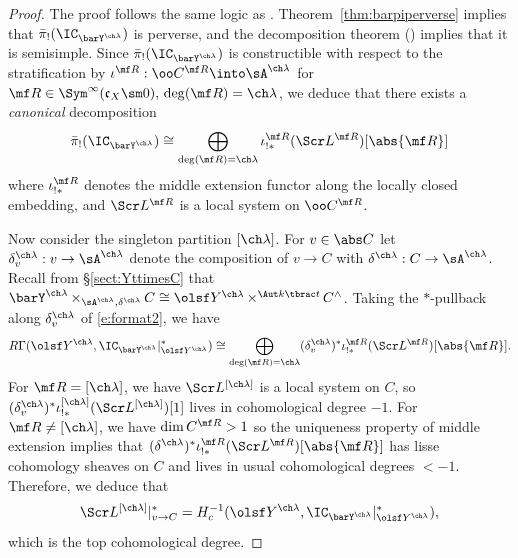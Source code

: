 \documentclass[final]{amsart}
\theoremstyle{remark}
\theoremstyle{definition}
\DeclareMathOperator*{\xt}{\times}
\numberwithin{equation}{section}
\begin{document}
\begin{proof}
The proof follows the same logic as \cite[\S 5.4, 5.11]{BFGM}. 
Theorem~\ref{thm:barpiperverse} implies that 
$\bar\pi_!(\IC_{\barY^{\ch\lambda}})$ is perverse, and 
the decomposition theorem (\cite[Th\'eor\`eme 6.2.5]{BBDG}) 
implies that it is semisimple. 
Since $\bar\pi_!(\IC_{\barY^{\ch\lambda}})$ is constructible
with respect to the stratification by $\iota^{\mf R} : \oo C^{\mf R} \into \sA^{\ch\lambda}$ for $\mf R \in \Sym^\infty(\mathfrak c_X\sm 0),\,
\deg(\mf R)=\ch\lambda$, we deduce that there exists a \emph{canonical} 
decomposition
\begin{equation}\label{e:format2} 
\bar\pi_!(\IC_{\barY^{\ch\lambda}}) \cong 
\bigoplus_{\deg(\mf R)=\ch\lambda} \iota^{\mf R}_{!*}(\Scr L^{\mf R}) [\abs{\mf R}] 
\end{equation}
where $\iota^{\mf R}_{!*}$ denotes the middle extension functor
along the locally closed embedding, and $\Scr L^{\mf R}$ 
is a local system on $\oo C^{\mf R}$.

Now consider the singleton partition $[\ch\lambda]$. 
For $v \in \abs C$ let $\delta^{\ch\lambda}_v : v \to\sA^{\ch\lambda}$
denote the composition of $v\to C$ with $\delta^{\ch\lambda}:C\to \sA^{\ch\lambda}$.
Recall from \S\ref{sect:YttimesC} 
that $\barY^{\ch\lambda} \xt_{\sA^{\ch\lambda}, \delta^{\ch\lambda}} C
\cong \olsf Y^{\ch\lambda} \xt^{\Aut k\tbrac t} C^\wedge$. 
Taking the $*$-pullback along $\delta_v^{\ch\lambda}$ of \eqref{e:format2}, we 
have 
\[ R\Gamma( \olsf Y^{\ch\lambda}, \IC_{\barY^{\ch\lambda}}|^*_{\olsf Y^{\ch\lambda}})
\cong \bigoplus_{\deg(\mf R)=\ch\lambda} (\delta^{\ch\lambda}_v)^* \iota^{\mf R}_{!*}(\Scr L^{\mf R})[\abs{\mf R}]. \]
For $\mf R = [\ch\lambda]$, we have $\Scr L^{[\ch\lambda]}$ is a local system 
on $C$, so $(\delta_v^{\ch\lambda})^* \iota^{[\ch\lambda]}_{!*}(\Scr L^{[\ch\lambda]})[1]$
lives in cohomological degree $-1$. 
For $\mf R \ne [\ch\lambda]$, we have $\dim C^{\mf R} > 1$
so the uniqueness property of middle extension implies that
$(\delta^{\ch\lambda})^* \iota^{\mf R}_{!*}(\Scr L^{\mf R})[\abs{\mf R}]$ 
has lisse cohomology sheaves on $C$ and lives in usual cohomological degrees $< -1$. 
Therefore, we deduce that 
\[ 
    \Scr L^{[\ch\lambda]} |^*_{v\to C} = H_c^{-1}(\olsf Y^{\ch\lambda}, \IC_{\barY^{\ch\lambda}}|^*_{\olsf Y^{\ch\lambda}}),
\]
which is the top cohomological degree. 


\end{proof}
\end{document}
